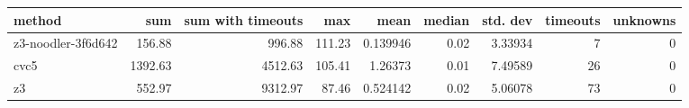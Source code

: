 \begin{tabular}{lrrrrrrrr}
\hline
 method             &     sum &   sum with timeouts &    max &     mean &   median &   std. dev &   timeouts &   unknowns \\
\hline
 z3-noodler-3f6d642 &  156.88 &              996.88 & 111.23 & 0.139946 &     0.02 &    3.33934 &          7 &          0 \\
 cvc5               & 1392.63 &             4512.63 & 105.41 & 1.26373  &     0.01 &    7.49589 &         26 &          0 \\
 z3                 &  552.97 &             9312.97 &  87.46 & 0.524142 &     0.02 &    5.06078 &         73 &          0 \\
\hline
\end{tabular}
